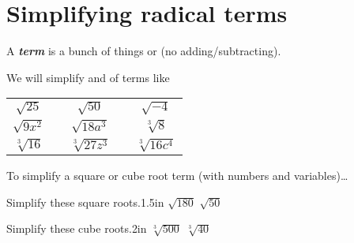 \section*{Simplifying radical terms}

A {\bfseries\itshape term} is a bunch of things 
 or  
(no adding/subtracting).

We will simplify  and  of terms like
\begin{center}
    \large
    \renewcommand{\arraystretch}{1.75}
    \begin{tabular}{ccccc}
        $\sqrt{25}$ & \hspace{1in} & $\sqrt{50}$ & \hspace{1in} & $\sqrt{-4}$\\
        $\sqrt{9x^2}$ & \hspace{1in} & $\sqrt{18a^3}$ & \hspace{1in} & $\sqrt[3]{8}$\\
        $\sqrt[3]{16}$ & \hspace{1in} & $\sqrt[3]{27z^3}$ & \hspace{1in} & $\sqrt[3]{16c^4}$\\
    \end{tabular}
\end{center}
        
\begin{myConceptSteps}{
    To simplify a square or cube root term (with numbers and variables)\dots
}
\end{myConceptSteps}

\begin{myProblems2}{Simplify these square roots.}{1.5in}
    {
        $\sqrt{180}$ %
    }
    {
        $\sqrt{50}$ %
    }
\end{myProblems2}

\begin{myProblems2}{Simplify these cube roots.}{2in}
    {
        $\sqrt[3]{500}$ %
    }
    {
        $\sqrt[3]{40}$ %
    }
\end{myProblems2}

